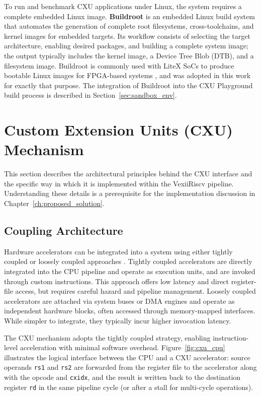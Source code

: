 To run and benchmark CXU applications under Linux, the system requires a complete
embedded Linux image.
\textbf{Buildroot} is an embedded Linux build system that automates the generation of
complete root filesystems, cross-toolchains, and kernel images for embedded targets.
Its workflow consists of selecting the target architecture, enabling desired packages,
and building a complete system image; the output typically includes the kernel image,
a Device Tree Blob (DTB), and a filesystem image.
Buildroot is commonly used with LiteX SoCs to produce bootable Linux images for
FPGA-based systems \cite{CXUPlayground}, and was adopted in this work for exactly
that purpose.
The integration of Buildroot into the CXU Playground build process is described in
Section~\ref{sec:sandbox_env}.

\section{Custom Extension Units (CXU) Mechanism}
\label{sec:cxu_mechanism}

This section describes the architectural principles behind the CXU interface and the
specific way in which it is implemented within the VexiiRiscv pipeline.
Understanding these details is a prerequisite for the implementation discussion in
Chapter~\ref{ch:proposed_solution}.

\subsection{Coupling Architecture}
\label{subsec:coupling}

Hardware accelerators can be integrated into a system using either tightly coupled or
loosely coupled approaches \cite{Gray2022CFU, Gray2025CXU}.
Tightly coupled accelerators are directly integrated into the CPU pipeline and operate as
execution units, and are invoked through custom instructions.
This approach offers low latency and direct register-file access, but requires careful
hazard and pipeline management.
Loosely coupled accelerators are attached via system buses or DMA engines and operate
as independent hardware blocks, often accessed through memory-mapped interfaces.
While simpler to integrate, they typically incur higher invocation latency.

The CXU mechanism adopts the tightly coupled strategy, enabling instruction-level
acceleration with minimal software overhead.
Figure~\ref{fig:cxu_cpu} illustrates the logical interface between the CPU and a CXU
accelerator: source operands \texttt{rs1} and \texttt{rs2} are forwarded from the
register file to the accelerator along with the opcode and \texttt{cxidx}, and the
result is written back to the destination register \texttt{rd} in the same pipeline
cycle (or after a stall for multi-cycle operations).

